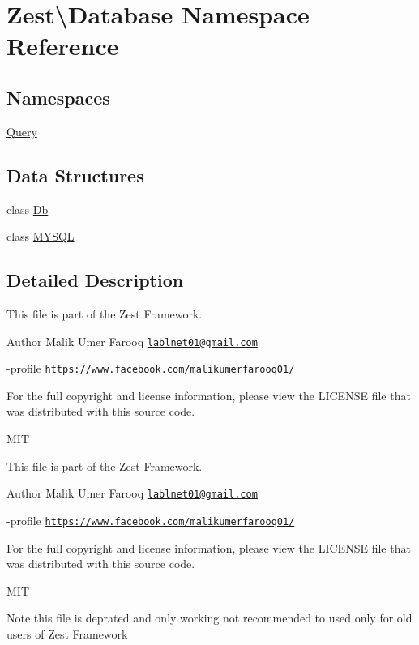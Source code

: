 \hypertarget{namespace_zest_1_1_database}{}\section{Zest\textbackslash{}Database Namespace Reference}
\label{namespace_zest_1_1_database}
\subsection*{Namespaces}
\begin{DoxyCompactItemize}
\item 
 \mbox{\hyperlink{namespace_zest_1_1_database_1_1_query}{Query}}
\end{DoxyCompactItemize}
\subsection*{Data Structures}
\begin{DoxyCompactItemize}
\item 
class \mbox{\hyperlink{class_zest_1_1_database_1_1_db}{Db}}
\item 
class \mbox{\hyperlink{class_zest_1_1_database_1_1_m_y_s_q_l}{M\+Y\+S\+QL}}
\end{DoxyCompactItemize}


\subsection{Detailed Description}
This file is part of the Zest Framework.

\begin{DoxyAuthor}{Author}
Malik Umer Farooq \href{mailto:lablnet01@gmail.com}{\tt lablnet01@gmail.\+com} 

-\/profile \href{https://www.facebook.com/malikumerfarooq01/}{\tt https\+://www.\+facebook.\+com/malikumerfarooq01/}
\end{DoxyAuthor}
For the full copyright and license information, please view the L\+I\+C\+E\+N\+SE file that was distributed with this source code.

M\+IT

This file is part of the Zest Framework.

\begin{DoxyAuthor}{Author}
Malik Umer Farooq \href{mailto:lablnet01@gmail.com}{\tt lablnet01@gmail.\+com} 

-\/profile \href{https://www.facebook.com/malikumerfarooq01/}{\tt https\+://www.\+facebook.\+com/malikumerfarooq01/}
\end{DoxyAuthor}
For the full copyright and license information, please view the L\+I\+C\+E\+N\+SE file that was distributed with this source code.

M\+IT

\begin{DoxyNote}{Note}
this file is deprated and only working not recommended to used only for old users of Zest Framework 
\end{DoxyNote}
